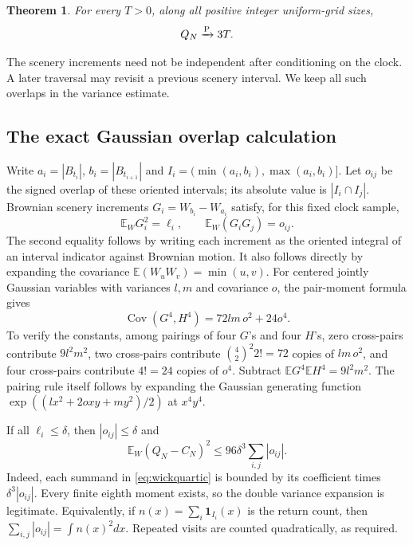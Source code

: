 \documentclass[11pt]{article}
\newtheorem{theorem}{Theorem}[section]
\theoremstyle{remark}\newtheorem{remark}[theorem]{Remark}
\begin{document}
\begin{theorem}\label{thm:quartic}
For every $T>0$, along all positive integer uniform-grid sizes,
\begin{equation}\label{eq:quarticlimit}
 Q_N\xrightarrow{\mathrm P}3T.
\end{equation}
\end{theorem}

The scenery increments need not be independent after conditioning
on the clock. A later traversal may revisit a previous scenery
interval. We keep all such overlaps in the variance estimate.

\subsection*{The exact Gaussian overlap calculation}
Write $a_i=|B_{t_i}|$, $b_i=|B_{t_{i+1}}|$ and
$I_i=(\min(a_i,b_i),\max(a_i,b_i)]$. Let $o_{ij}$ be the signed
overlap of these oriented intervals; its absolute value is
$|I_i\cap I_j|$. Brownian scenery increments $G_i=W_{b_i}-W_{a_i}$
satisfy, for this fixed clock sample,
\[
 \mathbb E_WG_i^2=\ell_i,\qquad
 \mathbb E_W(G_iG_j)=o_{ij}.
\]
The second equality follows by writing each increment as the
oriented integral of an interval indicator against Brownian motion.
It also follows directly by expanding the covariance
$\mathbb E(W_uW_v)=\min(u,v)$.
For centered jointly Gaussian variables with variances $l,m$ and
covariance $o$, the pair-moment formula gives
\begin{equation}\label{eq:wickquartic}
 \operatorname{Cov}(G^4,H^4)=72lm\,o^2+24o^4.
\end{equation}
To verify the constants, among pairings of four $G$'s and four
$H$'s, zero cross-pairs contribute $9l^2m^2$, two cross-pairs
contribute $\binom42^2 2!=72$ copies of $lm\,o^2$, and four
cross-pairs contribute $4!=24$ copies of $o^4$.
Subtract $\mathbb EG^4\mathbb EH^4=9l^2m^2$.
The pairing rule itself follows by expanding the Gaussian generating
function $\exp((lx^2+2oxy+my^2)/2)$ at $x^4y^4$.

If all $\ell_i\leq\delta$, then $|o_{ij}|\leq\delta$ and
\begin{equation}\label{eq:conditionalvariance}
 \mathbb E_W(Q_N-C_N)^2
 \leq96\delta^3\sum_{i,j}|o_{ij}|.
\end{equation}
Indeed, each summand in \eqref{eq:wickquartic} is bounded by its
coefficient times $\delta^3|o_{ij}|$. Every finite eighth moment
exists, so the double variance expansion is legitimate. Equivalently,
if $n(x)=\sum_i\mathbf1_{I_i}(x)$ is the return count, then
$\sum_{i,j}|o_{ij}|=\int n(x)^2dx$. Repeated visits are counted
quadratically, as required.
\end{document}
